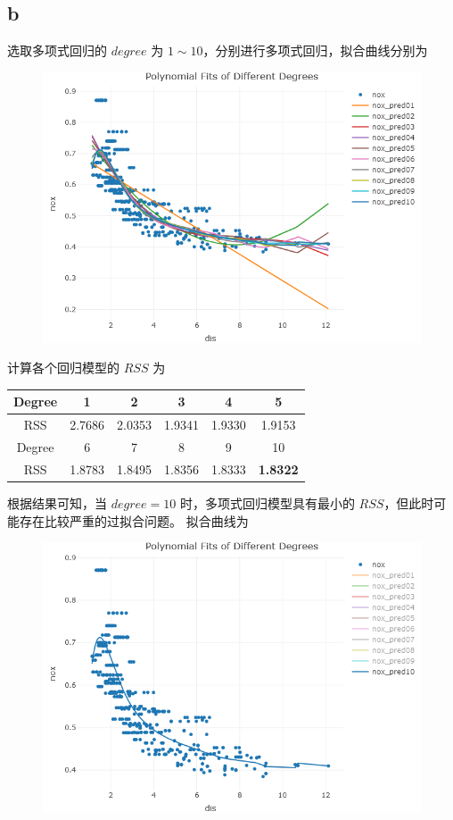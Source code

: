 \documentclass[12pt,a4paper]{article}
\begin{document}
    \subsection*{b}
    选取多项式回归的 $degree$ 为 $1\sim 10$，分别进行多项式回归，拟合曲线分别为
    \begin{figure}[H]
        \centering
        \includegraphics[scale=0.6]{PolyDeg.png}
    \end{figure}
    计算各个回归模型的 $RSS$ 为
    \begin{longtable}{c|c|c|c|c|c}
        \hline
        Degree & 1 & 2 & 3 & 4 & 5\\
        \hline
        RSS & 2.7686 & 2.0353 & 1.9341 & 1.9330 & 1.9153\\
        \hline
        \hline
        Degree & 6 & 7 & 8 & 9 & 10\\
        \hline
        RSS & 1.8783 & 1.8495 & 1.8356 & 1.8333 & \textbf{1.8322}\\
        \hline
    \end{longtable}
    根据结果可知，当 $degree=10$ 时，多项式回归模型具有最小的 $RSS$，但此时可能存在比较严重的过拟合问题。
    拟合曲线为
    \begin{figure}[H]
        \centering
        \includegraphics[scale=0.6]{Poly10Fit.png}
    \end{figure}
\end{document}
